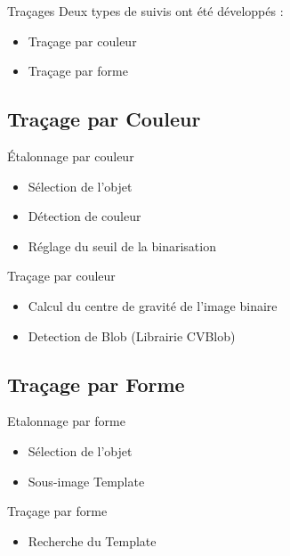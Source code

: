 \documentclass{beamer}
\begin{document}
		\begin{frame}{Traçages}
		Deux types de suivis ont été développés : \\
				\begin{itemize}
					\item{Traçage par couleur}
					\item{Traçage par forme}
				\end{itemize}
		\end{frame}

		\subsection{Traçage par Couleur}
		\begin{frame}{Étalonnage par couleur}
				\begin{itemize}
					\item{Sélection de l'objet}
					\item{Détection de couleur}
					\item{Réglage du seuil de la binarisation}
				\end{itemize}
		\end{frame}

		\begin{frame}{Traçage par couleur}
				\begin{itemize}
					\item{Calcul du centre de gravité de l'image binaire}
					\item{Detection de Blob (Librairie CVBlob)}
				\end{itemize}
		\end{frame}

		\subsection{Traçage par Forme}
		\begin{frame}{Etalonnage par forme}
				\begin{itemize}
					\item{Sélection de l'objet}
					\item{Sous-image Template}
				\end{itemize}
		\end{frame}

		\begin{frame}{Traçage par forme}
				\begin{itemize}
					\item{Recherche du Template}
				\end{itemize}
		\end{frame}
	
\end{document}

